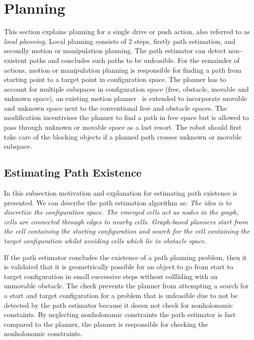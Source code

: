\section{Planning}%
\label{sec:planning}
This section explains planning for a single drive or push action, also referred to as \textit{local planning}. Local planning consists of 2 steps, firstly path estimation, and secondly motion or manipulation planning. The path estimator can detect non-existent paths and concludes such paths to be unfeasible. For the remainder of actions, motion or manipulation planning is responsible for finding a path from starting point to a target point in configuration space. The planner has to account for multiple subspaces in configuration space (free, obstacle, movable and unknown space), an existing motion planner~\cite{chen_fast_2018} is extended to incorporate movable and unknown space next to the conventional free and obstacle spaces. The modification incentivises the planner to find a path in free space but is allowed to pass through unknown or movable space as a last resort. The robot should first take care of the blocking objects if a planned path crosses unknown or movable subspace.\bs

\subsection{Estimating Path Existence}%
\label{subsec:path_estimation}
In this subsection motivation and explanation for estimating path existence is presented. We can describe the path estimation algorithm as: \textit{The idea is to discretize the configuration space. The emerged cells act as nodes in the graph, cells are connected through edges to nearby cells. Graph-based planners start from the cell containing the starting configuration and search for the cell containing the target configuration whilst avoiding cells which lie in obstacle space.\bs}

If the path estimator concludes the existence of a path planning problem, then it is validated that it is geometrically possible for an object to go from start to target configuration in small successive steps without collliding with an unmovable obstacle. The check prevents the planner from attempting a search for a start and target configuration for a problem that is unfeasible due to not be detected by the path estimator because it doesn not check for nonholonomic constaints. By neglecting nonholonamic constraints the path estimator is fast compared to the planner, the planner is responsible for checking the nonholonomic constraints.

